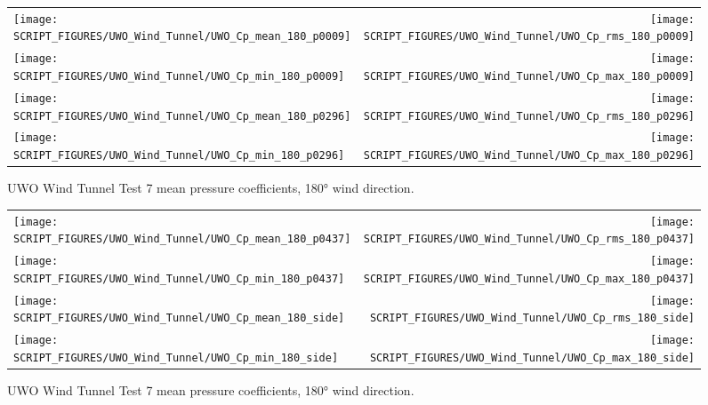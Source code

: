 \begin{figure}[p]
\begin{tabular*}{\textwidth}{l@{\extracolsep{\fill}}r}
\texttt{[image: SCRIPT\_FIGURES/UWO\_Wind\_Tunnel/UWO\_Cp\_mean\_180\_p0009]} &
\texttt{[image: SCRIPT\_FIGURES/UWO\_Wind\_Tunnel/UWO\_Cp\_rms\_180\_p0009]} \\
\texttt{[image: SCRIPT\_FIGURES/UWO\_Wind\_Tunnel/UWO\_Cp\_min\_180\_p0009]} &
\texttt{[image: SCRIPT\_FIGURES/UWO\_Wind\_Tunnel/UWO\_Cp\_max\_180\_p0009]} \\
\texttt{[image: SCRIPT\_FIGURES/UWO\_Wind\_Tunnel/UWO\_Cp\_mean\_180\_p0296]} &
\texttt{[image: SCRIPT\_FIGURES/UWO\_Wind\_Tunnel/UWO\_Cp\_rms\_180\_p0296]} \\
\texttt{[image: SCRIPT\_FIGURES/UWO\_Wind\_Tunnel/UWO\_Cp\_min\_180\_p0296]} &
\texttt{[image: SCRIPT\_FIGURES/UWO\_Wind\_Tunnel/UWO\_Cp\_max\_180\_p0296]}
\end{tabular*}
\caption[UWO Wind Tunnel Test 7 Pressure Coefficients, 180\si{\degree}]{UWO Wind Tunnel Test 7 mean pressure coefficients, 180\si{\degree} wind direction.}
\label{UWO_Test_7_pressure_coefficients_180_1}
\end{figure}

\begin{figure}[p]
\begin{tabular*}{\textwidth}{l@{\extracolsep{\fill}}r}
\texttt{[image: SCRIPT\_FIGURES/UWO\_Wind\_Tunnel/UWO\_Cp\_mean\_180\_p0437]} &
\texttt{[image: SCRIPT\_FIGURES/UWO\_Wind\_Tunnel/UWO\_Cp\_rms\_180\_p0437]} \\
\texttt{[image: SCRIPT\_FIGURES/UWO\_Wind\_Tunnel/UWO\_Cp\_min\_180\_p0437]} &
\texttt{[image: SCRIPT\_FIGURES/UWO\_Wind\_Tunnel/UWO\_Cp\_max\_180\_p0437]} \\
\texttt{[image: SCRIPT\_FIGURES/UWO\_Wind\_Tunnel/UWO\_Cp\_mean\_180\_side]} &
\texttt{[image: SCRIPT\_FIGURES/UWO\_Wind\_Tunnel/UWO\_Cp\_rms\_180\_side]}  \\
\texttt{[image: SCRIPT\_FIGURES/UWO\_Wind\_Tunnel/UWO\_Cp\_min\_180\_side]} &
\texttt{[image: SCRIPT\_FIGURES/UWO\_Wind\_Tunnel/UWO\_Cp\_max\_180\_side]}
\end{tabular*}
\caption[UWO Wind Tunnel Test 7 Pressure Coefficients, 180\si{\degree}]{UWO Wind Tunnel Test 7 mean pressure coefficients, 180\si{\degree} wind direction.}
\label{UWO_Test_7_pressure_coefficients_180_2}
\end{figure}

